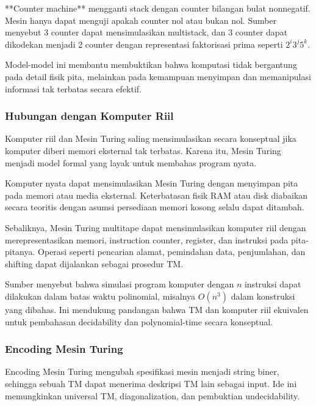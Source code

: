 **Counter machine** mengganti stack dengan counter bilangan bulat nonnegatif. Mesin hanya dapat menguji apakah counter nol atau bukan nol. Sumber menyebut 3 counter dapat mensimulasikan multistack, dan 3 counter dapat dikodekan menjadi 2 counter dengan representasi faktorisasi prima seperti $2^i3^j5^k$.

Model-model ini membantu membuktikan bahwa komputasi tidak bergantung pada detail fisik pita, melainkan pada kemampuan menyimpan dan memanipulasi informasi tak terbatas secara efektif.

\subsubsection{Hubungan dengan Komputer Riil}

\begin{jawab}
Komputer riil dan Mesin Turing saling mensimulasikan secara konseptual jika komputer diberi memori eksternal tak terbatas. Karena itu, Mesin Turing menjadi model formal yang layak untuk membahas program nyata.
\end{jawab}

Komputer nyata dapat mensimulasikan Mesin Turing dengan menyimpan pita pada memori atau media eksternal. Keterbatasan fisik RAM atau disk diabaikan secara teoritis dengan asumsi persediaan memori kosong selalu dapat ditambah.

Sebaliknya, Mesin Turing multitape dapat mensimulasikan komputer riil dengan merepresentasikan memori, instruction counter, register, dan instruksi pada pita-pitanya. Operasi seperti pencarian alamat, pemindahan data, penjumlahan, dan shifting dapat dijalankan sebagai prosedur TM.

Sumber menyebut bahwa simulasi program komputer dengan $n$ instruksi dapat dilakukan dalam batas waktu polinomial, misalnya $O(n^3)$ dalam konstruksi yang dibahas. Ini mendukung pandangan bahwa TM dan komputer riil ekuivalen untuk pembahasan decidability dan polynomial-time secara konseptual.

\subsubsection{Encoding Mesin Turing}

\begin{jawab}
Encoding Mesin Turing mengubah spesifikasi mesin menjadi string biner, sehingga sebuah TM dapat menerima deskripsi TM lain sebagai input. Ide ini memungkinkan universal TM, diagonalization, dan pembuktian undecidability.
\end{jawab}

